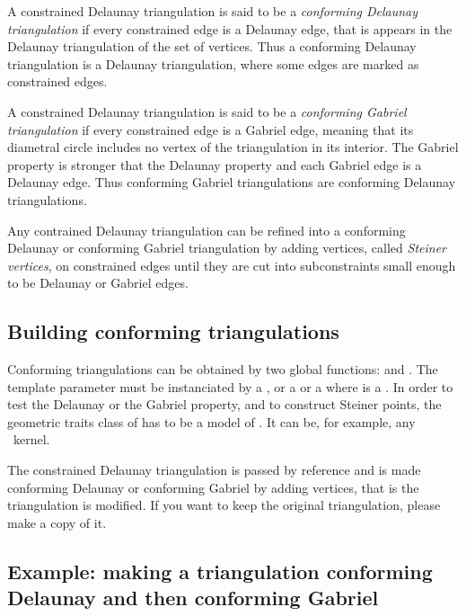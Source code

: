 A constrained Delaunay triangulation is said to be a \emph{conforming
  Delaunay triangulation} if every constrained edge is a Delaunay
edge, that is appears in the Delaunay triangulation of the set of
vertices. Thus a conforming Delaunay triangulation is a Delaunay
triangulation, where some edges are marked as constrained edges.

A constrained Delaunay triangulation is said to be a \emph{conforming
  Gabriel triangulation} if every constrained edge is a Gabriel edge,
meaning that its diametral circle includes no vertex of the
triangulation in its interior. The Gabriel property is stronger that
the Delaunay property and each Gabriel edge is a Delaunay edge. Thus
conforming Gabriel triangulations are conforming Delaunay
triangulations.

Any contrained Delaunay triangulation can be refined into a conforming
Delaunay or conforming Gabriel triangulation by adding vertices,
called \emph{Steiner vertices}, on constrained edges until they are
cut into subconstraints small enough to be Delaunay or Gabriel edges.

\subsection{Building conforming triangulations}
\label{sec:Mesh_2_building_conforming}

Conforming triangulations can be obtained by two global functions:
 and
. The
template parameter  must be instanciated by a
, or a
 or a
 where  is a
. In order to test
the Delaunay or the Gabriel property, and to construct Steiner points,
the geometric traits class of  has to be a model of
. It can be, for example,
any \cgal\ kernel.

The constrained Delaunay triangulation  is passed by reference
and is made conforming Delaunay or conforming Gabriel by adding
vertices, that is the triangulation is modified. If you want to keep
the original triangulation, please make a copy of it.

\subsection{Example: making a triangulation conforming Delaunay and then
  conforming Gabriel}
\label{sec:Mesh_2_example_making_conforming}

